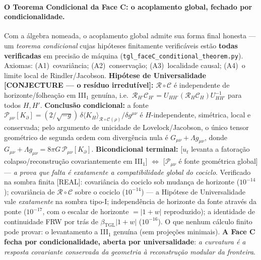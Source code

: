 \documentclass[12pt,a4paper]{article}
\newcommand{\betatgl}{\beta_{\text{TGL}}}
\newcommand{\Kpartial}{K_{\partial}}
\begin{document}
\paragraph{O Teorema Condicional da Face C: o acoplamento global, fechado por condicionalidade.}  Com a álgebra nomeada, o acoplamento global admite sua forma final honesta --- um \emph{teorema condicional} cujas hipóteses finitamente verificáveis estão \textbf{todas verificadas} em precisão de máquina (\texttt{tgl\_faceC\_conditional\_theorem.py}).  Axiomas: (A1)~covariância; (A2)~conservação; (A3)~localidade causal; (A4)~o limite local de Rindler/Jacobson.  \textbf{Hipótese de Universalidade [CONJECTURE --- o resíduo irredutível]:} $\mathcal R\circ\mathcal C$ é independente de horizonte/folheação em III$_1$ genuína, i.e.\ $\mathcal R_{H'}\mathcal C_{H'} = U_{HH'}(\mathcal R_H\mathcal C_H)U_{HH'}^{-1}$ para todos $H, H'$.  \textbf{Conclusão condicional:} a fonte $\mathcal P_{\mu\nu}[\Kpartial] = (2/\sqrt{-g})\,\delta\langle K_H\rangle_{\mathcal R\circ\mathcal C(\rho)}/\delta g^{\mu\nu}$ é $H$-independente, simétrica, local e conservada; pelo argumento de unicidade de Lovelock/Jacobson, o único tensor geométrico de segunda ordem com divergência nula é $G_{\mu\nu}+\Lambda g_{\mu\nu}$, donde $G_{\mu\nu}+\Lambda g_{\mu\nu} = 8\pi G\,\mathcal P_{\mu\nu}[\Kpartial]$.  \textbf{Bicondicional terminal:} [$u_t$ levanta a fatoração colapso/reconstrução covariantemente em III$_1$] $\Longleftrightarrow$ [$\mathcal P_{\mu\nu}$ é fonte geométrica global] --- \emph{a prova que falta é exatamente a compatibilidade global do cociclo}.  Verificado na sombra finita [REAL]: covariância do cociclo sob mudança de horizonte ($10^{-14}$); covariância de $\mathcal R\circ\mathcal C$ sobre o cociclo ($10^{-14}$) --- a Hipótese de Universalidade vale \emph{exatamente} na sombra tipo-I; independência de horizonte da fonte através da ponte ($10^{-17}$, com o escalar de horizonte $=|1{+}w|$ reproduzido); a identidade de continuidade FRW por trás de $\betatgl|1{+}w|$ ($10^{-16}$).  O que nenhum cálculo finito pode provar: o levantamento a III$_1$ genuína (sem projeções minimais).  \textbf{A Face C fecha por condicionalidade, aberta por universalidade}: \emph{a curvatura é a resposta covariante conservada da geometria à reconstrução modular da fronteira}.
\end{document}
